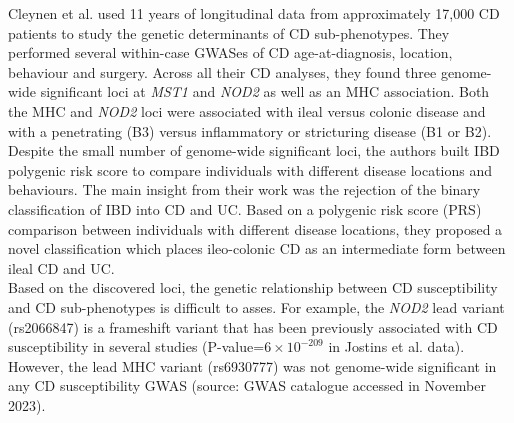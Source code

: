 Cleynen et al. \cite{Cleynen2016-ha} used 11 years of longitudinal data from approximately 17,000 CD patients to study the genetic determinants of CD sub-phenotypes. They performed several within-case GWASes of CD age-at-diagnosis, location, behaviour and surgery. Across all their CD analyses, they found three genome-wide significant loci at \textit{MST1} and \textit{NOD2} as well as an MHC association. Both the MHC and  \textit{NOD2} loci were associated with ileal versus colonic disease and with a penetrating (B3) versus inflammatory or stricturing disease (B1 or B2). Despite the small number of genome-wide significant loci, the authors built IBD polygenic risk score to compare individuals with different disease locations and behaviours. The main insight from their work was the rejection of the binary classification of IBD into CD and UC. Based on a polygenic risk score (PRS) comparison between individuals with different disease locations, they proposed a novel classification which places ileo-colonic CD as an intermediate form between ileal CD and UC. \\

Based on the discovered loci, the genetic relationship between CD susceptibility and CD sub-phenotypes is difficult to asses. For example, the \textit{NOD2} lead variant (rs2066847) is a frameshift variant that has been previously associated with CD susceptibility in several studies \cite{Barrett2008-lg,Jostins2012-ig} (P-value=$6\times10^{-209}$ in Jostins et al. data). However, the lead MHC variant (rs6930777) was not genome-wide significant in any CD susceptibility GWAS (source: GWAS catalogue accessed in November 2023). \\

